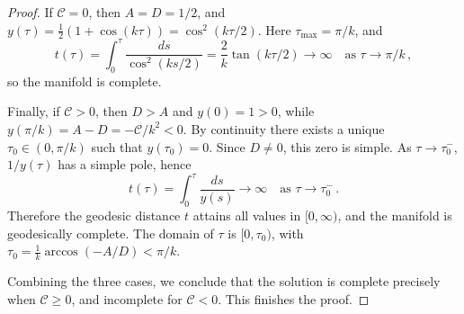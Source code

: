 \documentclass[10pt,a4paper]{amsart}
\newcommand{\cC}{\mathcal{C}}
\begin{document}
\begin{proof}
If $\cC = 0$, then $A = D = 1/2$, and $y(\tau) = \frac12(1+\cos(k\tau)) = \cos^2(k\tau/2)$. Here $\tau_{\max} = \pi/k$, and
\begin{equation*}
t(\tau) = \int_0^\tau \frac{ds}{\cos^2(ks/2)} = \frac{2}{k}\tan(k\tau/2) \longrightarrow \infty \quad \text{as } \tau \to \pi/k \,,
\end{equation*}
so the manifold is complete.

Finally, if $\cC > 0$, then $D > A$ and $y(0)=1>0$, while $y(\pi/k) = A - D = -\cC/k^2 < 0$. By continuity there exists a unique $\tau_0 \in (0,\pi/k)$ such that $y(\tau_0)=0$. Since $D \neq 0$, this zero is simple. As $\tau \to \tau_0^-$, $1/y(\tau)$ has a simple pole, hence
\begin{equation*}
t(\tau) = \int_0^\tau \frac{ds}{y(s)} \longrightarrow \infty \quad \text{as } \tau \to \tau_0^- \,.
\end{equation*}
Therefore the geodesic distance $t$ attains all values in $[0,\infty)$, and the manifold is geodesically complete. The domain of $\tau$ is $[0,\tau_0)$, with $\tau_0 = \frac{1}{k}\arccos(-A/D) < \pi/k$.

Combining the three cases, we conclude that the solution is complete precisely when $\cC \ge 0$, and incomplete for $\cC < 0$. This finishes the proof.
\end{proof}
\end{document}
